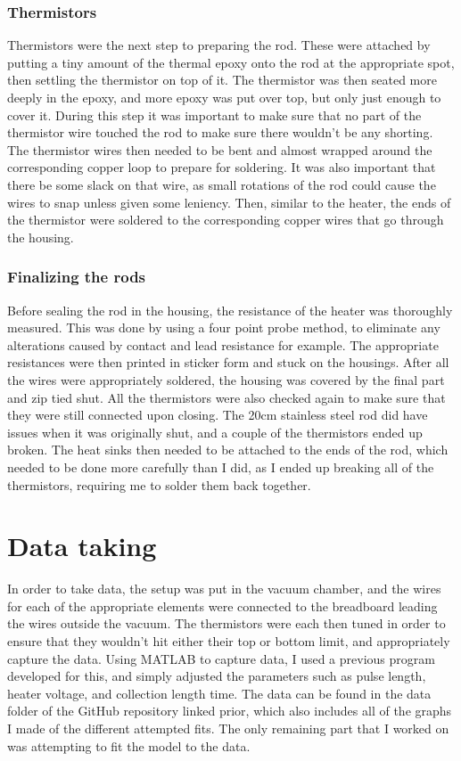\documentclass[11pt,a4paper,notitlepage,fleqn]{article}
\begin{document}
	\subsubsection{Thermistors}
	Thermistors were the next step to preparing the rod. These were attached by putting a tiny amount of the thermal epoxy onto the rod at the appropriate spot, then settling the thermistor on top of it. The thermistor was then seated more deeply in the epoxy, and more epoxy was put over top, but only just enough to cover it. During this step it was important to make sure that no part of the thermistor wire touched the rod to make sure there wouldn't be any shorting. The thermistor wires then needed to be bent and almost wrapped around the corresponding copper loop to prepare for soldering. It was also important that there be some slack on that wire, as small rotations of the rod could cause the wires to snap unless given some leniency. Then, similar to the heater, the ends of the thermistor were soldered to the corresponding copper wires that go through the housing.
	\subsubsection{Finalizing the rods}
	Before sealing the rod in the housing, the resistance of the heater was thoroughly measured. This was done by using a four point probe method, to eliminate any alterations caused by contact and lead resistance for example. The appropriate resistances were then printed in sticker form and stuck on the housings. After all the wires were appropriately soldered, the housing was covered by the final part and zip tied shut. All the thermistors were also checked again to make sure that they were still connected upon closing. The 20cm stainless steel rod did have issues when it was originally shut, and a couple of the thermistors ended up broken. The heat sinks then needed to be attached to the ends of the rod, which needed to be done more carefully than I did, as I ended up breaking all of the thermistors, requiring me to solder them back together.
	\section{Data taking}
	In order to take data, the setup was put in the vacuum chamber, and the wires for each of the appropriate elements were connected to the breadboard leading the wires outside the vacuum. The thermistors were each then tuned in order to ensure that they wouldn't hit either their top or bottom limit, and appropriately capture the data. Using MATLAB to capture data, I used a previous program developed for this, and simply adjusted the parameters such as pulse length, heater voltage, and collection length time. The data can be found in the data folder of the GitHub repository linked prior, which also includes all of the graphs I made of the different attempted fits. The only remaining part that I worked on was attempting to fit the model to the data. 
\end{document}
